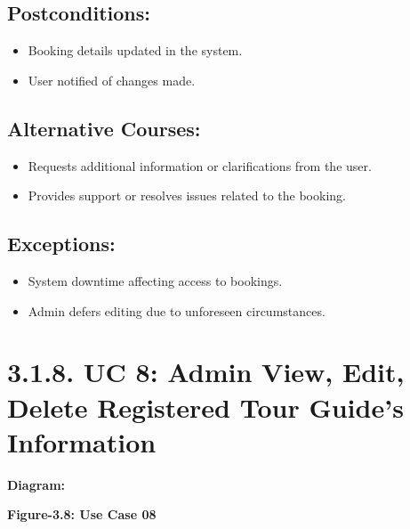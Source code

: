 \documentclass{scrreprt}
\begin{document}
\subsection*{\textbf{Postconditions:}}

\begin{itemize}
    \item Booking details updated in the system.
    \item User notified of changes made.
\end{itemize}

\subsection*{\textbf{Alternative Courses:}}

\begin{itemize}
    \item Requests additional information or clarifications from the user.
    \item Provides support or resolves issues related to the booking.
\end{itemize}

\subsection*{\textbf{Exceptions:}}

\begin{itemize}
    \item System downtime affecting access to bookings.
    \item Admin defers editing due to unforeseen circumstances.
\end{itemize}

\section*{\textbf{3.1.8. UC 8: Admin View, Edit, Delete Registered Tour Guide's Information}}
\textbf{Diagram:}
\newline

\begin{center}
    \parbox{0.8\textwidth}{ 
        \centering
    }
\end{center}
\begin{center}
    \parbox{0.8\textwidth}{ 
        \centering
        \textbf{Figure-3.8: Use Case 08}
    }
\end{center}
\end{document}
